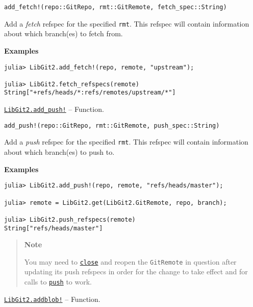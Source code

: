 \begin{adjustwidth}{2em}{0pt}


\begin{verbatim}
add_fetch!(repo::GitRepo, rmt::GitRemote, fetch_spec::String)
\end{verbatim}

Add a \emph{fetch} refspec for the specified \texttt{rmt}. This refspec will contain information about which branch(es) to fetch from.

\textbf{Examples}


\begin{verbatim}
julia> LibGit2.add_fetch!(repo, remote, "upstream");

julia> LibGit2.fetch_refspecs(remote)
String["+refs/heads/*:refs/remotes/upstream/*"]
\end{verbatim}



\end{adjustwidth}
\hypertarget{2424007891894294055}{}
\hyperlink{2424007891894294055}{\texttt{LibGit2.add\_push!}}  -- {Function.}

\begin{adjustwidth}{2em}{0pt}


\begin{verbatim}
add_push!(repo::GitRepo, rmt::GitRemote, push_spec::String)
\end{verbatim}

Add a \emph{push} refspec for the specified \texttt{rmt}. This refspec will contain information about which branch(es) to push to.

\textbf{Examples}


\begin{verbatim}
julia> LibGit2.add_push!(repo, remote, "refs/heads/master");

julia> remote = LibGit2.get(LibGit2.GitRemote, repo, branch);

julia> LibGit2.push_refspecs(remote)
String["refs/heads/master"]
\end{verbatim}

\begin{quote}
\textbf{Note}

You may need to \hyperlink{5331333469799487255}{\texttt{close}} and reopen the \texttt{GitRemote} in question after updating its push refspecs in order for the change to take effect and for calls to \hyperlink{9401118176170322302}{\texttt{push}} to work.

\end{quote}


\end{adjustwidth}
\hypertarget{12021530861844417654}{}
\hyperlink{12021530861844417654}{\texttt{LibGit2.addblob!}}  -- {Function.}

